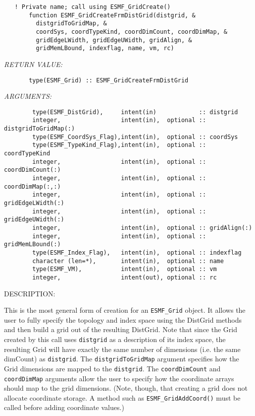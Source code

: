  
\begin{verbatim}   ! Private name; call using ESMF_GridCreate()
       function ESMF_GridCreateFrmDistGrid(distgrid, &
         distgridToGridMap, &
         coordSys, coordTypeKind, coordDimCount, coordDimMap, &
         gridEdgeLWidth, gridEdgeUWidth, gridAlign, &
         gridMemLBound, indexflag, name, vm, rc)\end{verbatim}{\em RETURN VALUE:}
\begin{verbatim}       type(ESMF_Grid) :: ESMF_GridCreateFrmDistGrid\end{verbatim}{\em ARGUMENTS:}
\begin{verbatim}        type(ESMF_DistGrid),     intent(in)            :: distgrid
        integer,                 intent(in),  optional :: distgridToGridMap(:)
        type(ESMF_CoordSys_Flag),intent(in),  optional :: coordSys
        type(ESMF_TypeKind_Flag),intent(in),  optional :: coordTypeKind
        integer,                 intent(in),  optional :: coordDimCount(:)
        integer,                 intent(in),  optional :: coordDimMap(:,:)
        integer,                 intent(in),  optional :: gridEdgeLWidth(:)
        integer,                 intent(in),  optional :: gridEdgeUWidth(:)
        integer,                 intent(in),  optional :: gridAlign(:)
        integer,                 intent(in),  optional :: gridMemLBound(:)
        type(ESMF_Index_Flag),   intent(in),  optional :: indexflag
        character (len=*),       intent(in),  optional :: name
        type(ESMF_VM),           intent(in),  optional :: vm
        integer,                 intent(out), optional :: rc\end{verbatim}
{\sf DESCRIPTION:\\ }


   This is the most general form of creation for an {\tt ESMF\_Grid}
   object. It allows the user to fully specify the topology and index space
   using the DistGrid methods and then build a grid out
   of the resulting DistGrid. Note that since the Grid created by this call
   uses {\tt distgrid} as a description of its index space, the resulting Grid
   will have exactly the same number of dimensions (i.e. the same dimCount) as
   {\tt distgrid}. The {\tt distgridToGridMap} argument
   specifies how the Grid dimensions are mapped to the {\tt distgrid}.
   The {\tt coordDimCount} and {\tt coordDimMap} arguments
   allow the user to specify how the coordinate arrays should map to the grid
   dimensions. (Note, though, that creating a grid does not allocate coordinate
   storage. A method such as {\tt ESMF\_GridAddCoord()} must be called
   before adding coordinate values.)
  
